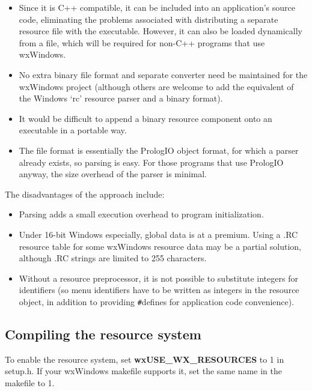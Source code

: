 \begin{itemize}\itemsep=0pt
\item Since it is C++ compatible, it can be included into an application's source code,
eliminating the problems associated with distributing a separate resource file
with the executable. However, it can also be loaded dynamically from a file, which will be required
for non-C++ programs that use wxWindows.
\item No extra binary file format and separate converter need be maintained for the wxWindows project
(although others are welcome to add the equivalent of the Windows `rc' resource
parser and a binary format).
\item It would be difficult to append a binary resource component onto an executable
in a portable way.
\item The file format is essentially the PrologIO object format, for which
a parser already exists, so parsing is easy. For those programs that use PrologIO
anyway, the size overhead of the parser is minimal.
\end{itemize}

The disadvantages of the approach include:

\begin{itemize}\itemsep=0pt
\item Parsing adds a small execution overhead to program initialization.
\item Under 16-bit Windows especially, global data is at a premium.
Using a .RC resource table for some wxWindows resource data may be a partial solution,
although .RC strings are limited to 255 characters.
\item Without a resource preprocessor, it is not possible to substitute integers
for identifiers (so menu identifiers have to be written as integers in the resource
object, in addition to providing \verb$#$defines for application code convenience).
\end{itemize}

\subsection{Compiling the resource system}

To enable the resource system, set {\bf wxUSE\_WX\_RESOURCES} to 1 in setup.h.
If your wxWindows makefile supports it, set the same name in the makefile to 1.

